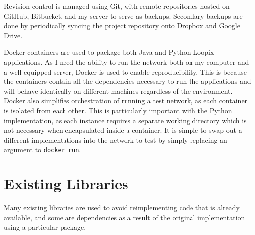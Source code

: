 \documentclass[final,dissertation.tex]{subfiles}
\begin{document}
Revision control is managed using Git, with remote repositories hosted on GitHub, Bitbucket, and my server to serve as backups. Secondary backups are done by periodically syncing the project repository onto Dropbox and Google Drive.

Docker containers are used to package both Java and Python Loopix applications. As I need the ability to run the network both on my computer and a well-equipped server, Docker is used to enable reproducibility. This is because the containers contain all the dependencies necessary to run the applications and will behave identically on different machines regardless of the environment. Docker also simplifies orchestration of running a test network, as each container is isolated from each other. This is particularly important with the Python implementation, as each instance requires a separate working directory which is not necessary when encapsulated inside a container. It is simple to swap out a different implementations into the network to test by simply replacing an argument to \verb|docker run|.

\section{Existing Libraries}

Many existing libraries are used to avoid reimplementing code that is already available, and some are dependencies as a result of the original implementation using a particular package.
\end{document}
